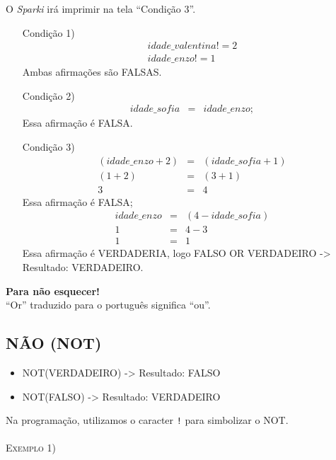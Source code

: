     O \textsl{Sparki} irá imprimir na tela ``Condição 3''.
    \begin{itemize}
        \item[Condição 1)] 
        \begin{eqnarray}
        idade\_valentina != 2\\
        idade\_enzo != 1 \nonumber
        \end{eqnarray}
        Ambas afirmações são FALSAS.
        \item[Condição 2)]
        \begin{eqnarray}
        idade\_sofia & = & idade\_enzo;
        \end{eqnarray}
        Essa afirmação é FALSA.
        \item[Condição 3)]
        \begin{eqnarray}
        (idade\_enzo + 2) & = & (idade\_sofia + 1)\\
        (1 + 2) & = & (3 + 1) \nonumber \\
        3 & = & 4 \nonumber
        \end{eqnarray}
        Essa afirmação é FALSA;
        \begin{eqnarray}
        idade\_enzo & = & (4 - idade\_sofia)\\
        1 & = & 4 - 3 \nonumber \\
        1 & = & 1 \nonumber
        \end{eqnarray}
        Essa afirmação é VERDADERIA, logo FALSO OR VERDADEIRO -> Resultado: VERDADEIRO.
    \end{itemize}
     
    \begin{center}
        \textcolor{mydarkblue}{\textbf{Para não esquecer!}}
        \\``Or'' traduzido para o português significa ``ou''.
    \end{center}
     
\subsection{NÃO (NOT)}

    \begin{itemize}
        \item NOT(VERDADEIRO) -> Resultado: FALSO
        \item NOT(FALSO) -> Resultado: VERDADEIRO
    \end{itemize}
    
    Na programação, utilizamos o caracter \lstinline[columns=fixed]{!} para simbolizar o NOT.
    \\~\\
    \textsc{Exemplo 1)}
     
